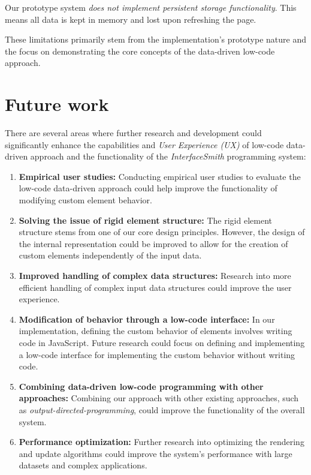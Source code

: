 Our prototype system \emph{does not implement persistent storage functionality}.
This means all data is kept in memory and lost upon refreshing the page.

These limitations primarily stem from the implementation's prototype nature and the focus on demonstrating the core concepts of the data-driven low-code approach.


\medskip
\section{Future work}
There are several areas where further research and development could significantly enhance the capabilities and \emph{User Experience (UX)} of low-code data-driven approach and the functionality of the \emph{InterfaceSmith} programming system:
\begin{enumerate}
	\item \textbf{Empirical user studies:} Conducting empirical user studies to evaluate the low-code data-driven approach could help improve the functionality of modifying custom element behavior.
	\item \textbf{Solving the issue of rigid element structure:} The rigid element structure stems from one of our core design principles. However, the design of the internal representation could be improved to allow for the creation of custom elements independently of the input data.
	\item \textbf{Improved handling of complex data structures:} Research into more efficient handling of complex input data structures could improve the user experience.
	\item \textbf{Modification of behavior through a low-code interface:} In our implementation, defining the custom behavior of elements involves writing code in JavaScript.
	      Future research could focus on defining and implementing a low-code interface for implementing the custom behavior without writing code.
	\item \textbf{Combining data-driven low-code programming with other approaches:} Combining our approach with other existing approaches, such as \emph{output-directed-programming}\cite{output-directed-programming}, could improve the functionality of the overall system.
	\item \textbf{Performance optimization:} Further research into optimizing the rendering and update algorithms could improve the system's performance with large datasets and complex applications.
\end{enumerate}
